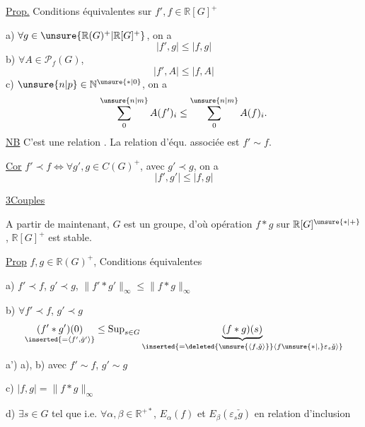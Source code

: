 \uline{Prop.} Conditions équivalentes sur $f',f\in\mathbb R[G]^+$

a) $\forall g\in\unsure{\mathbb R(G)^+|\mathbb R[G]^+}$, on a
\[
|f',g|\leq|f,g|
\]
b) $\forall A\in\mathcal P_f(G)$, \unsure{$\ldots$}
\[
|f',A|\leq|f,A|
\]
c) \deleted{\unsure{$\forall$}} $\unsure{n|p}\in\mathbb N^{\unsure{\ast|0}}$, on a
\[
\sum_0^{\unsure{n|m}}A(f')_i\leq\sum_0^{\unsure{n|m}}A(f)_i.
\]
\uline{NB} C'est une relation  . La relation d'équ. associée est $f'\sim f$.


\uline{Cor} $f'\prec f\Longleftrightarrow\forall g',g\in C(G)^+$, avec $g'\prec g$, on a
\[
|f',g'|\leq|f,g|
\]

\uline{3}\quad\uline{Couples }

A partir de maintenant, $G$ est un groupe, d'où opération $f\ast g$ sur $\mathbb R[G]^{\unsure{\ast|+}}$, $\mathbb R[G]^+$ est stable.


\uline{Prop} $f,g\in\mathbb R(G)^+$, Conditions équivalentes

a) $f'\prec f$, $g'\prec g$, $\|f'\ast g'\|_\infty\leq\|f\ast g\|_\infty$

b) $\forall f'\prec f$, $g'\prec g$
\[
\underset{\inserted{=\langle f',\check g'\rangle}}{(f'\ast g')(0)}
\leq\operatorname{Sup}_{s\in G}
\underbrace{(f\ast g)(s)}_{\inserted{=\deleted{\unsure{\langle f,\check g\rangle}}\langle f\unsure{\ast|,}\varepsilon_s\check g\rangle}}
\]
a')  a), b) avec $f'\sim f$, $g'\sim g$

c) $|f,g|=\|f\ast g\|_\infty$

d) $\exists s\in G$ tel que
i.e. $\forall\alpha,\beta\in\mathbb R^{+\ast}$, $E_\alpha(f)$ et $E_\beta(\varepsilon_s\check g)$ en relation d'inclusion

